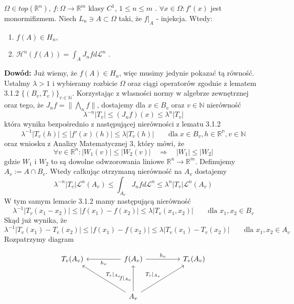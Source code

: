 \begin{tw}
	$\Omega \in top(\mathbb{R}^n)$, $f: \Omega \rightarrow \mathbb{R}^m$ klasy $C^1$, $1 \leq n \leq m$ . $\forall x \in \Omega: f'(x)$ jest monormifizmem. Niech $L_n \ni A \subset \Omega$ taki, że $f|_A$ - injekcja. Wtedy:
	\begin{enumerate}	
		\item $f(A) \in H_n$,
		\item $\mathcal{H}^n(f(A)) = \int_A J_nfd \mathcal{L}^n$ .
	\end{enumerate}
	
	\textbf{Dowód:}\newline
	Już wiemy, że $f(A) \in H_n$, więc musimy jedynie pokazać tą równość. Ustalmy $\lambda > 1$ i wybieramy rozbicie $\Omega$ oraz ciągi operatorów zgodnie z lematem 3.1.2 $\{(B_v, T_v)\}_{v \in \mathbb{N}}$. Korzystając z własności normy w algebrze zewnętrznej oraz tego, że $J_nf = \|\bigwedge_nf\|$, dostajemy dla $x \in B_v$ oraz $v \in \mathbb{N}$ nierówność 
	$$
		\lambda^{-n}|T_v| \leq (J_nf)(x) \leq \lambda^n|T_v|
	$$
	która wynika bezpośrednio z następującej nierówności z lematu 3.1.2
	$$
		\lambda^{-1}|T_v(h)| \leq |f'(x)(h)| \leq \lambda|T_v(h)| \quad\quad  \text{dla} \; x \in B_v, h \in \mathbb{R^n}, v \in \mathbb{N}
	$$ 
	oraz wniosku \citep[8.41]{Tworzewski} z Analizy Matematycznej 3, który mówi, że
	$$
		\forall v \in \mathbb{R}^n: |W_1(v)| \leq |W_2(v)| \quad \Longrightarrow \quad |W_1| \leq |W_2|
	$$
	gdzie $W_1$ i $W_2$ to są dowolne odwzorowania liniowe $\mathbb{R}^n \rightarrow \mathbb{R}^m$.
	Definujemy $A_v := A \cap B_v$. Wtedy całkując otrzymaną nierówność na $A_v$ dostajemy $$
		\lambda^{-n}|T_v|\mathcal{L}^n(A_v) \leq \int_{A_v}J_nf d \mathcal{L}^n \leq \lambda^n |T_v| \mathcal{L}^n(A_v)
	$$
	W tym samym lemacie 3.1.2 mamy następującą nierówność $$
		\lambda^{-1}|T_v(x_1 - x_2)| \leq |f(x_1) - f(x_2)| \leq \lambda |T_v(x_1, x_2)| \quad \quad \text{dla } x_1,x_2 \in B_v  
	$$
	Skąd już wynika, że $$
		\lambda^{-1}|T_v(x_1) - T_v(x_2)| \leq |f(x_1) - f(x_2)| \leq \lambda|T_v(x_1) - T_v(x_2)| \quad \quad \text{dla } x_1, x_2 \in A_v
	$$
	Rozpatrzymy diagram

	$$
	\begin{tikzcd}
		T_v(A_v) &    & f(A_v) \arrow[ll, "h_v"] \arrow[rr, "h_v"]                                               &  & T_v(A_v) \\
				&     &                                                                                   &  &          \\
				&     & A_v \arrow[lluu, "T_v|_{A_v}"'] \arrow[rruu, "T_v|_{A_v}"] \arrow[uu, "f|_{A_v}"] &  &         
	\end{tikzcd}
	$$




\end{tw}
